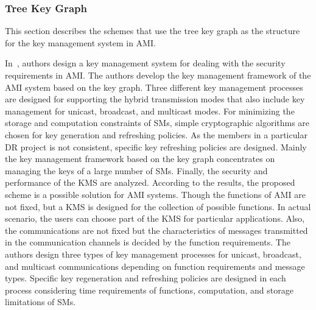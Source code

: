 \subsubsection{Tree Key Graph}
This section describes the schemes that use the tree key graph as the structure for the key management system in AMI.
\par In~\cite{Liu13}, authors design a key management system for dealing with the security requirements in AMI. The authors develop the key management framework of the AMI system based on the key graph. Three different key management processes are designed for supporting the hybrid transmission modes that also include key management for unicast, broadcast, and multicast modes. For minimizing the storage and computation constraints of SMs, simple cryptographic algorithms are chosen for key generation and refreshing policies. As the members in a particular DR project is not consistent, specific key refreshing policies are designed. Mainly the key management framework based on the key graph concentrates on managing the keys of a large number of SMs. Finally, the security and performance of the KMS are analyzed. According to the results, the proposed scheme is a possible solution for AMI systems. Though the functions of AMI are not fixed, but a KMS is designed for the collection of possible functions. In actual scenario, the users can choose part of the KMS for particular applications. Also, the communications are not fixed but the characteristics of messages transmitted in the communication channels is decided by the function requirements. The authors design three types of key management processes for unicast, broadcast, and multicast communications depending on function requirements and message types. Specific key regeneration and refreshing policies are designed in each process considering time requirements of functions, computation, and storage limitations of SMs.

